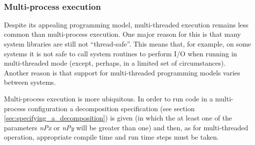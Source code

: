 \\

\subsubsection{Multi-process execution}
\label{sec:multi_process_execution}

Despite its appealing programming model, multi-threaded execution
remains less common than multi-process execution. One major reason for
this is that many system libraries are still not ``thread-safe''. This
means that, for example, on some systems it is not safe to call system
routines to perform I/O when running in multi-threaded mode (except,
perhaps, in a limited set of circumstances).  Another reason is that
support for multi-threaded programming models varies between systems.

Multi-process execution is more ubiquitous.  In order to run code in a
multi-process configuration a decomposition specification (see section
\ref{sec:specifying_a_decomposition}) is given (in which the at least
one of the parameters {\em nPx} or {\em nPy} will be greater than one)
and then, as for multi-threaded operation, appropriate compile time
and run time steps must be taken.

